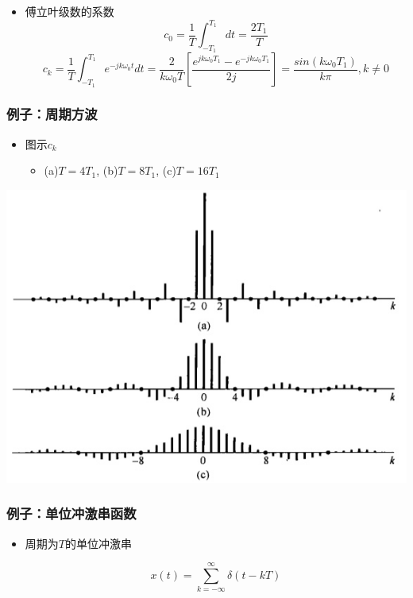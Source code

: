 \documentclass[CJKutf8,xcolor=pdftex,dvipsnames,table]{beamer}
\begin{document}
\begin{CJK*}{UTF8}{song}
\begin{frame}
\begin{itemize}
  	\item 傅立叶级数的系数\[ c_0 = \frac{1}{T}\int_{-T_1}^{T_1}dt=\frac{2T_1}{T} \] 
   	\[ c_k = \frac{1}{T}\int_{-T_1}^{T_1}e^{-jk\omega_0 t}dt = \frac{2}{k\omega_0 T}[\frac{e^{jk\omega_0 T_1}-e^{-jk\omega_0 T_1}}{2j}]=\frac{sin(k\omega_0 T_1)}{k\pi}, k \neq 0\] 

	\end{itemize} 
  \end{frame}    

  \begin{frame}
    \frametitle{例子：周期方波}
    \begin{itemize}
    \item 图示$c_k$
    	\begin{itemize}
	    \item (a)$T=4T_1$, (b)$T=8T_1$, (c)$T=16T_1$
	    \end{itemize}
    \end{itemize}
    \begin{center}
      \includegraphics[scale=.5]{ss-c-f3-7}
    \end{center}
  \end{frame} 
  
  \begin{frame}
    \frametitle{例子：单位冲激串函数}
    \begin{itemize}
    \item 周期为$T$的单位冲激串 
	
\[ x(t) = \sum_{k=-\infty}^{\infty}\delta(t-kT) \]
    

\end{itemize}
\end{frame}
\end{CJK*}
\end{document}
